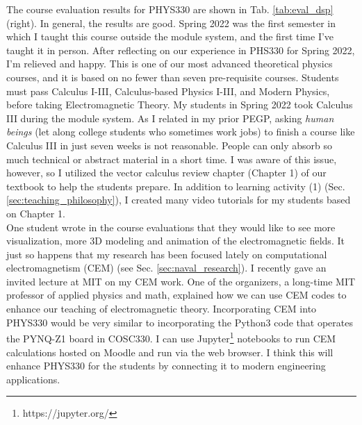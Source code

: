 \documentclass[../../main.tex]{subfiles}
\begin{document}
The course evaluation results for PHYS330 are shown in Tab. \ref{tab:eval_dsp} (right).  In general, the results are good.  Spring 2022 was the first semester in which I taught this course outside the module system, and the first time I've taught it in person.  After reflecting on our experience in PHS330 for Spring 2022, I'm relieved and happy.  This is one of our most advanced theoretical physics courses, and it is based on no fewer than seven pre-requisite courses.  Students must pass Calculus I-III, Calculus-based Physics I-III, and Modern Physics, before taking Electromagnetic Theory.  My students in Spring 2022 took Calculus III during the module system.  As I related in my prior PEGP, asking \textit{human beings} (let along college students who sometimes work jobs) to finish a course like Calculus III in just seven weeks is not reasonable.  People can only absorb so much technical or abstract material in a short time.  I was aware of this issue, however, so I utilized the vector calculus review chapter (Chapter 1) of our textbook to help the students prepare.  In addition to learning activity (1) (Sec. \ref{sec:teaching_philosophy}), I created many video tutorials for my students based on Chapter 1.
\\
\vspace{0.25cm}
One student wrote in the course evaluations that they would like to see more visualization, more 3D modeling and animation of the electromagnetic fields.  It just so happens that my research has been focused lately on computational electromagnetism (CEM) (see Sec. \ref{sec:naval_research}).  I recently gave an invited lecture at MIT on my CEM work.  One of the organizers, a long-time MIT professor of applied physics and math, explained how we can use CEM codes to enhance our teaching of electromagnetic theory.  Incorporating CEM into PHYS330 would be very similar to incorporating the Python3 code that operates the PYNQ-Z1 board in COSC330.  I can use Jupyter\footnote{https://jupyter.org/} notebooks to run CEM calculations hosted on Moodle and run via the web browser.  I think this will enhance PHYS330 for the students by connecting it to modern engineering applications.
\end{document}
